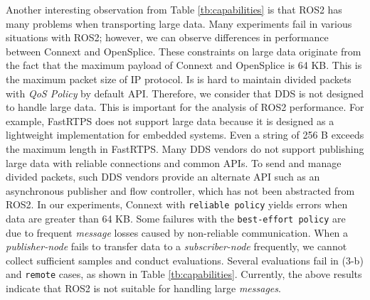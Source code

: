 \documentclass{sig-alternate-05-2015}
\begin{document}
Another interesting observation from Table \ref{tb:capabilities} is that ROS2 has many problems when transporting large data.
Many experiments fail in various situations with ROS2; however, we can observe differences in performance between Connext and OpenSplice.
These constraints on large data originate from the fact that the maximum payload of Connext and OpenSplice is 64 KB.
This is the maximum packet size of IP protocol.
Is is hard to maintain divided packets with \emph{QoS Policy} by default API.
Therefore, we consider that DDS is not designed to handle large data.
This is important for the analysis of ROS2 performance.
For example, FastRTPS does not support large data because it is designed as a lightweight implementation for embedded systems.
Even a string of 256 B exceeds the maximum length in FastRTPS.
Many DDS vendors do not support publishing large data with reliable connections and common APIs.
To send and manage divided packets, such DDS vendors provide an alternate API such as an asynchronous publisher and flow controller, which has not been abstracted from ROS2.
In our experiments, Connext with \texttt{reliable policy} yields errors when data are greater than 64 KB.
Some failures with the \texttt{best-effort policy} are due to frequent \emph{message} losses caused by non-reliable communication. 
When a \emph{publisher-node} fails to transfer data to a \emph{subscriber-node} frequently, we cannot collect sufficient samples and conduct evaluations.
Several evaluations fail in (3-b) and \texttt{remote} cases, as shown in Table \ref{tb:capabilities}.
Currently, the above results indicate that ROS2 is not suitable for handling large \emph{messages}.
\end{document}
